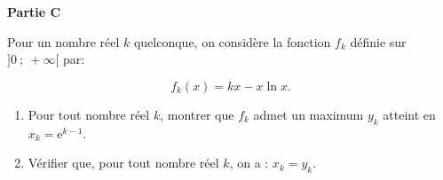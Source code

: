 \bigskip

\textbf{Partie C}

\medskip

Pour un nombre réel $k$ quelconque, on considère la fonction $f_k$ définie sur $]0~;~+\infty[$ par:

\[f_k(x) = kx - x \ln x.\]

\begin{enumerate}
\item Pour tout nombre réel $k$, montrer que $f_k$ admet un maximum $y_k$ atteint en $x_k = \text{e}^{k- 1}$.
\item  Vérifier que, pour tout nombre réel $k$, on a : $x_k = y_k$.
\end{enumerate}

\bigskip
